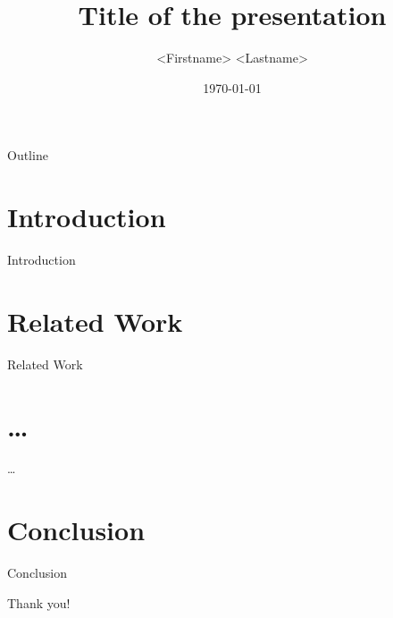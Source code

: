 \documentclass[]{beamer} %
\title{Title of the presentation}
\author{<Firstname> <Lastname>}
\date{\today}
\begin{document}
\maketitle

\begin{frame}{Outline}
	\begin{minipage}[t][10em][t]{\linewidth}
		\tableofcontents
	\end{minipage}
\end{frame}

\section{Introduction}

\begin{frame}{Introduction}
\end{frame}

\section{Related Work}

\begin{frame}{Related Work}
\end{frame}

\section{\protect\dots}

\begin{frame}{\dots}
\end{frame}

\section{Conclusion}

\begin{frame}{Conclusion}
\end{frame}

\begin{titleframe}
	\begin{center}
	\alert{\Large Thank you!}
	\end{center}
\end{titleframe}
\end{document}

